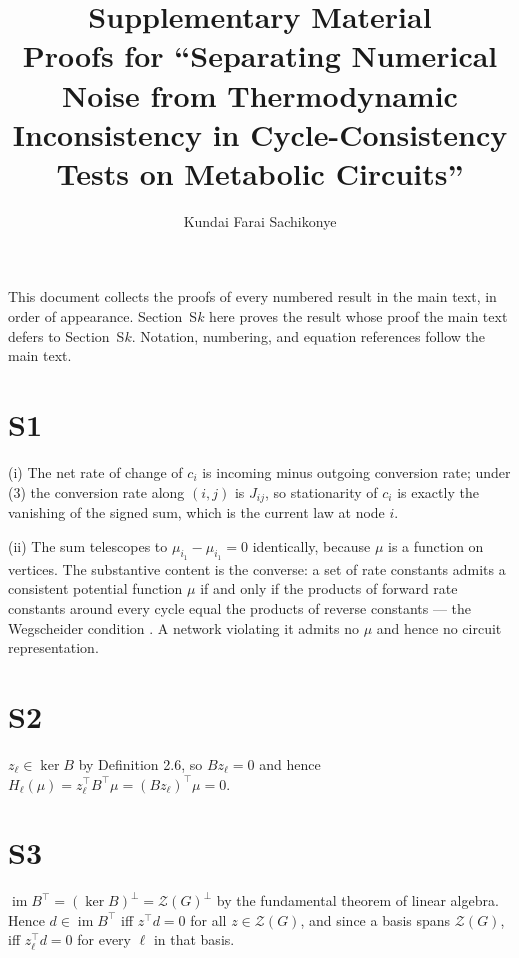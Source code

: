 \documentclass[11pt,a4paper]{article}
\title{Supplementary Material\\[4pt]
\large Proofs for ``Separating Numerical Noise from Thermodynamic
Inconsistency in Cycle-Consistency Tests on Metabolic Circuits''}
\author{Kundai Farai Sachikonye}
\date{}
\theoremstyle{definition}
\theoremstyle{remark}
\newcommand{\hol}{H}
\begin{document}
\maketitle

\noindent
This document collects the proofs of every numbered result in the main
text, in order of appearance. Section~S$k$ here proves the result whose
proof the main text defers to Section~S$k$. Notation, numbering, and
equation references follow the main text.

\section*{S1}
(i) The net rate of change of $c_i$ is incoming minus outgoing
conversion rate; under (3) the conversion rate along $(i,j)$
is $J_{ij}$, so stationarity of $c_i$ is exactly the vanishing of the
signed sum, which is the current law at node $i$.

(ii) The sum telescopes to $\mu_{i_1}-\mu_{i_1}=0$ identically, because
$\mu$ is a function on vertices. The substantive content is the
converse: a set of rate constants admits a consistent potential function
$\mu$ if and only if the products of forward rate constants around every
cycle equal the products of reverse constants --- the Wegscheider
condition \citep{wegscheider1901,schuster1989}. A network violating it
admits no $\mu$ and hence no circuit representation.

\section*{S2}
$z_\ell\in\ker B$ by Definition 2.6, so
$B z_\ell = 0$ and hence $\hol_\ell(\mu)=z_\ell^{\top}B^{\top}\mu
= (Bz_\ell)^{\top}\mu = 0$.

\section*{S3}
$\operatorname{im}B^{\top} = (\ker B)^{\perp} = \mathcal{Z}(G)^{\perp}$
by the fundamental theorem of linear algebra. Hence $d\in
\operatorname{im}B^{\top}$ iff $z^{\top}d=0$ for all
$z\in\mathcal{Z}(G)$, and since a basis spans $\mathcal{Z}(G)$, iff
$z_\ell^{\top}d=0$ for every $\ell$ in that basis.
\end{document}
